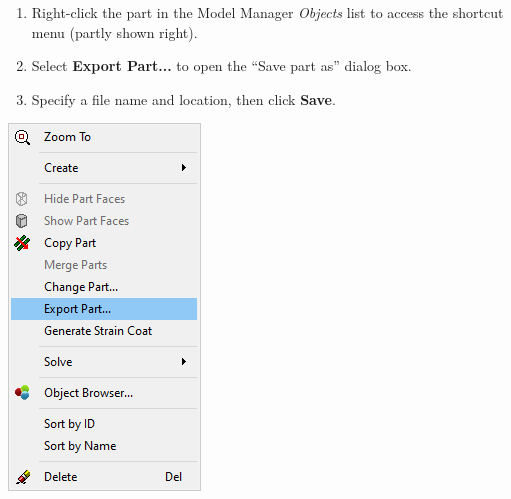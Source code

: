 \noindent
\begin{minipage}{0.65\textwidth}
  \raggedright
  \begin{enumerate}
  \item Right-click the part in the Model Manager {\sl Objects} list to access
    the shortcut menu (partly shown right).
  \item Select \textbf{Export Part...} to open the \newline
    ``Save part as'' dialog box.
  \item Specify a file name and location, \newline
    then click \textbf{Save}.
  \end{enumerate}
\end{minipage}%
\begin{minipage}{0.35\textwidth}
  \raggedleft
  \includegraphics[trim=0 35 0 20,clip,width=\textwidth]{Figures/2-ExportPart}
\end{minipage}


